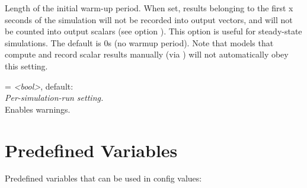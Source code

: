\begin{description}
    Length of the initial warm-up period. When set, results belonging to the
    first x seconds of the simulation will not be recorded into output vectors,
    and will not be counted into output scalars (see option
    ).
    This option is useful for steady-state simulations. The default is 0s (no
    warmup period). Note that models that compute and record scalar results
    manually (via ) will not automatically obey this
    setting.
\item[warnings] = \textit{<bool>}, default: \\
    \textit{Per-simulation-run setting.}\\
    Enables warnings.
\end{description}

\section{Predefined Variables}
\label{sec:config-options:predefined-variables}

Predefined variables that can be used in config values:

